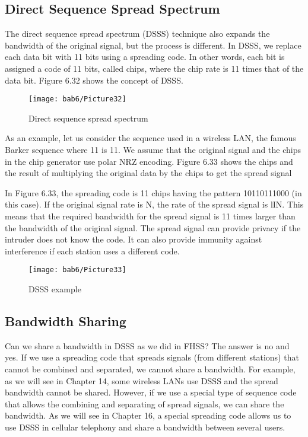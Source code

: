 \subsection{Direct Sequence Spread Spectrum}
The direct sequence spread spectrum (DSSS) technique also expands the bandwidth of the original signal, but the process is different. In DSSS, we replace each data bit with 11 bits using a spreading code. In other words, each bit is assigned a code of 11 bits, called chips, where the chip rate is 11 times that of the data bit. Figure 6.32 shows the concept of DSSS.

\begin{figure}[htbp]
  \centering
  \texttt{[image: bab6/Picture32]}
  \caption{Direct sequence spread spectrum}
  \label{fig6:31}
\end{figure}

As an example, let us consider the sequence used in a wireless LAN, the famous Barker sequence where 11 is 11. We assume that the original signal and the chips in the chip generator use polar NRZ encoding. Figure 6.33 shows the chips and the result of multiplying the original data by the chips to get the spread signal

In Figure 6.33, the spreading code is 11 chips having the pattern 10110111000 (in this case). If the original signal rate is N, the rate of the spread signal is lIN. This means that the required bandwidth for the spread signal is 11 times larger than the bandwidth of the original signal. The spread signal can provide privacy if the intruder does not know the code. It can also provide immunity against interference if each station uses a different code.

\begin{figure}[htbp]
  \centering
  \texttt{[image: bab6/Picture33]}
  \caption{DSSS example}
  \label{fig6:32}
\end{figure}

\subsection*{Bandwidth Sharing}
Can we share a bandwidth in DSSS as we did in FHSS? The answer is no and yes. If we use a spreading code that spreads signals (from different stations) that cannot be combined and separated, we cannot share a bandwidth. For example, as we will see in Chapter 14, some wireless LANs use DSSS and the spread bandwidth cannot be shared. However, if we use a special type of sequence code that allows the combining and separating of spread signals, we can share the bandwidth. As we will see in Chapter 16, a special spreading code allows us to use DSSS in cellular telephony and share a bandwidth between several users.

